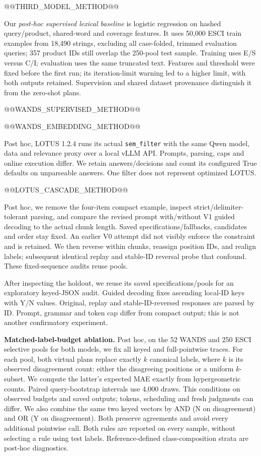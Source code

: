 \documentclass[conference]{IEEEtran}
\begin{document}
@@THIRD_MODEL_METHOD@@

Our \emph{post-hoc supervised lexical baseline} is logistic regression on hashed query/product, shared-word and coverage features. It uses 50,000 ESCI train examples from 18,490 strings, excluding all case-folded, trimmed evaluation queries; 357 product IDs still overlap the 250-pool test sample. Training uses E/S versus C/I; evaluation uses the same truncated text. Features and threshold were fixed before the first run; its iteration-limit warning led to a higher limit, with both outputs retained. Supervision and shared dataset provenance distinguish it from the zero-shot plans.

@@WANDS_SUPERVISED_METHOD@@

@@WANDS_EMBEDDING_METHOD@@

Post hoc, LOTUS 1.2.4 runs its actual \texttt{sem\_filter} with the same Qwen model, data and relevance proxy over a local vLLM API. Prompts, parsing, caps and online execution differ. We retain answers/decisions and count its configured True defaults on unparseable answers. One filter does not represent optimized LOTUS.

@@LOTUS_CASCADE_METHOD@@

Post hoc, we remove the four-item compact example, inspect strict/delimiter-tolerant parsing, and compare the revised prompt with/without V1 guided decoding to the actual chunk length. Saved specifications/fallbacks, candidates and order stay fixed. An earlier V0 attempt did not visibly enforce the constraint and is retained. We then reverse within chunks, reassign position IDs, and realign labels; subsequent identical replay and stable-ID reversal probe that confound. These fixed-sequence audits reuse pools.

After inspecting the holdout, we reuse its saved specifications/pools for an exploratory keyed-JSON audit. Guided decoding fixes ascending local-ID keys with Y/N values. Original, replay and stable-ID-reversed responses are parsed by ID. Prompt, grammar and token cap differ from compact output; this is not another confirmatory experiment.

\textbf{Matched-label-budget ablation.} Post hoc, on the 52 WANDS and 250 ESCI selective pools for both models, we fix all keyed and full-pointwise traces. For each pool, both virtual plans replace exactly $k$ canonical labels, where $k$ is its observed disagreement count: either the disagreeing positions or a uniform $k$-subset. We compute the latter's expected MAE exactly from hypergeometric counts. Paired query-bootstrap intervals use 4,000 draws. This conditions on observed budgets and saved outputs; tokens, scheduling and fresh judgments can differ. We also combine the same two keyed vectors by AND (N on disagreement) and OR (Y on disagreement). Both preserve agreements and avoid every additional pointwise call. Both rules are reported on every sample, without selecting a rule using test labels. Reference-defined class-composition strata are post-hoc diagnostics.
\end{document}
